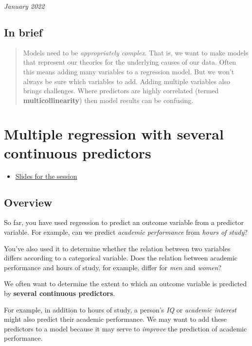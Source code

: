 \documentclass[
]{book}
\providecommand{\tightlist}{%
  \setlength{\itemsep}{0pt}\setlength{\parskip}{0pt}}
\theoremstyle{definition}
\theoremstyle{definition}
\theoremstyle{definition}
\theoremstyle{definition}
\theoremstyle{remark}
\begin{document}
\emph{January 2022}

\hypertarget{in-brief}{%
\subsection{In brief}\label{in-brief}}

\begin{quote}
Models need to be \emph{appropriately complex}. That is, we want to make models
that represent our theories for the underlying causes of our data. Often this
means adding many variables to a regression model. But we won't
always be sure which variables to add. Adding multiple variables also brings
challenges. Where predictors are highly correlated (termed \textbf{multicollinearity})
then model results can be confusing.
\end{quote}

\hypertarget{multiple-regression-with-several-continuous-predictors}{%
\section{Multiple regression with several continuous predictors}\label{multiple-regression-with-several-continuous-predictors}}

\begin{itemize}
\tightlist
\item
  \href{slides/PSYC753_Chris1.pptx}{Slides for the session}
\end{itemize}

\hypertarget{overview-1}{%
\subsection{Overview}\label{overview-1}}

So far, you have used regression to predict an outcome variable from a predictor variable. For example, can we predict \emph{academic performance} from \emph{hours of study}?

You've also used it to determine whether the relation between two variables differs according to a categorical variable. Does the relation between academic performance and hours of study, for example, differ for \emph{men} and \emph{women}?

\hfill\break
We often want to determine the extent to which an outcome variable is predicted by \textbf{several continuous predictors}.

For example, in addition to hours of study, a person's \emph{IQ} or \emph{academic interest} might also predict their academic performance. We may want to add these predictors to a model because it may serve to \emph{improve} the prediction of academic performance.
\end{document}
